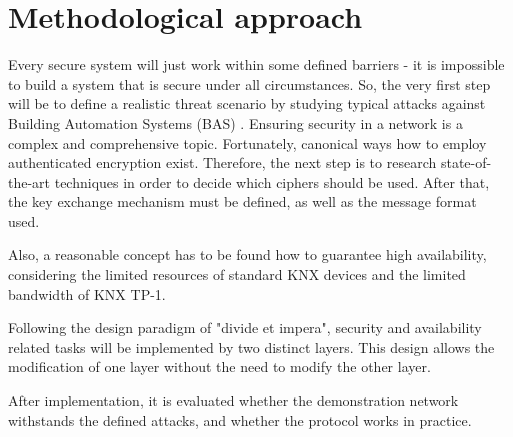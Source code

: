 \documentclass[a4paper,11pt,oneside]{memoir}
\begin{document}
\section{Methodological approach}

Every secure system will just work within some defined barriers - it is impossible to build a system that
is secure under all circumstances. So, the very first step will be to define a realistic
threat scenario by studying typical attacks against Building Automation Systems (BAS) \cite{granzer2006security}.
Ensuring security in a network is a complex and comprehensive topic. Fortunately, canonical ways how to employ authenticated
encryption exist. 
Therefore, the next step is to research state-of-the-art techniques in order to decide which ciphers should be used. After that, the key exchange mechanism
must be defined, as well as the message format used. 

Also, a reasonable concept has to be found how
to guarantee high availability, considering the limited resources of standard KNX devices and the limited bandwidth of KNX TP-1.

Following the design paradigm of "divide et impera", security and availability related tasks will be implemented by two distinct layers. This design 
allows the modification of one layer without the need to modify the other layer.


After implementation, it is evaluated whether the demonstration network withstands the defined attacks,
and whether the protocol works in practice.
 
\end{document}
